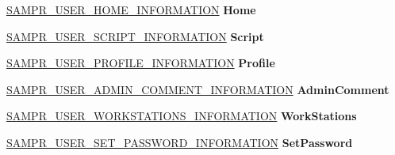 \begin{DoxyCompactItemize}
\item 
\mbox{\label{union___s_a_m_p_r___u_s_e_r___i_n_f_o___b_u_f_f_e_r_a43b3173436586c4714c1887991a6d705}} 
\hyperlink{struct___s_a_m_p_r___u_s_e_r___h_o_m_e___i_n_f_o_r_m_a_t_i_o_n}{S\+A\+M\+P\+R\+\_\+\+U\+S\+E\+R\+\_\+\+H\+O\+M\+E\+\_\+\+I\+N\+F\+O\+R\+M\+A\+T\+I\+ON} {\bfseries Home}
\item 
\mbox{\label{union___s_a_m_p_r___u_s_e_r___i_n_f_o___b_u_f_f_e_r_ac37c83fe8ff90e95372a3437d72e9009}} 
\hyperlink{struct___s_a_m_p_r___u_s_e_r___s_c_r_i_p_t___i_n_f_o_r_m_a_t_i_o_n}{S\+A\+M\+P\+R\+\_\+\+U\+S\+E\+R\+\_\+\+S\+C\+R\+I\+P\+T\+\_\+\+I\+N\+F\+O\+R\+M\+A\+T\+I\+ON} {\bfseries Script}
\item 
\mbox{\label{union___s_a_m_p_r___u_s_e_r___i_n_f_o___b_u_f_f_e_r_a5d89c6be7c31a72211000f3199e5e53e}} 
\hyperlink{struct___s_a_m_p_r___u_s_e_r___p_r_o_f_i_l_e___i_n_f_o_r_m_a_t_i_o_n}{S\+A\+M\+P\+R\+\_\+\+U\+S\+E\+R\+\_\+\+P\+R\+O\+F\+I\+L\+E\+\_\+\+I\+N\+F\+O\+R\+M\+A\+T\+I\+ON} {\bfseries Profile}
\item 
\mbox{\label{union___s_a_m_p_r___u_s_e_r___i_n_f_o___b_u_f_f_e_r_a773022ea3c04cb2bba1189dd2614606f}} 
\hyperlink{struct___s_a_m_p_r___u_s_e_r___a_d_m_i_n___c_o_m_m_e_n_t___i_n_f_o_r_m_a_t_i_o_n}{S\+A\+M\+P\+R\+\_\+\+U\+S\+E\+R\+\_\+\+A\+D\+M\+I\+N\+\_\+\+C\+O\+M\+M\+E\+N\+T\+\_\+\+I\+N\+F\+O\+R\+M\+A\+T\+I\+ON} {\bfseries Admin\+Comment}
\item 
\mbox{\label{union___s_a_m_p_r___u_s_e_r___i_n_f_o___b_u_f_f_e_r_a2074221b9c710dd58780505f1e9ffe16}} 
\hyperlink{struct___s_a_m_p_r___u_s_e_r___w_o_r_k_s_t_a_t_i_o_n_s___i_n_f_o_r_m_a_t_i_o_n}{S\+A\+M\+P\+R\+\_\+\+U\+S\+E\+R\+\_\+\+W\+O\+R\+K\+S\+T\+A\+T\+I\+O\+N\+S\+\_\+\+I\+N\+F\+O\+R\+M\+A\+T\+I\+ON} {\bfseries Work\+Stations}
\item 
\mbox{\label{union___s_a_m_p_r___u_s_e_r___i_n_f_o___b_u_f_f_e_r_a2c35704a8b65e359672c0d6f008aa2a5}} 
\hyperlink{struct___s_a_m_p_r___u_s_e_r___s_e_t___p_a_s_s_w_o_r_d___i_n_f_o_r_m_a_t_i_o_n}{S\+A\+M\+P\+R\+\_\+\+U\+S\+E\+R\+\_\+\+S\+E\+T\+\_\+\+P\+A\+S\+S\+W\+O\+R\+D\+\_\+\+I\+N\+F\+O\+R\+M\+A\+T\+I\+ON} {\bfseries Set\+Password}

\end{DoxyCompactItemize}
